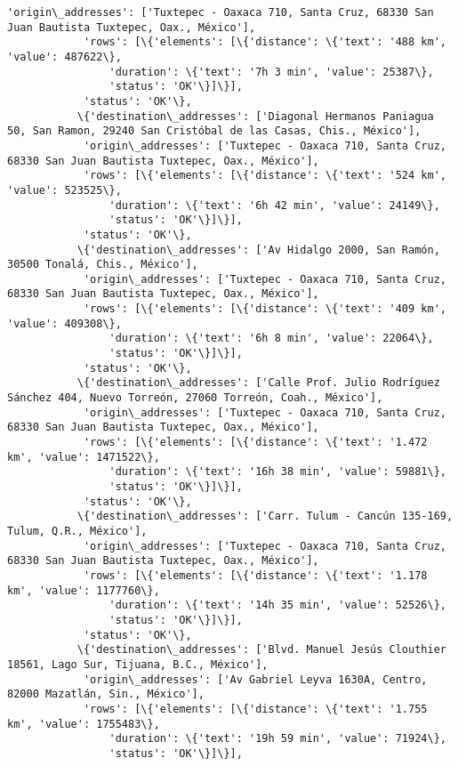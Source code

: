 \documentclass[11pt]{article}
\begin{document}
\begin{Verbatim}[commandchars=\\\{\}]
            'origin\_addresses': ['Tuxtepec - Oaxaca 710, Santa Cruz, 68330 San Juan Bautista Tuxtepec, Oax., México'],
            'rows': [\{'elements': [\{'distance': \{'text': '488 km', 'value': 487622\},
                'duration': \{'text': '7h 3 min', 'value': 25387\},
                'status': 'OK'\}]\}],
            'status': 'OK'\},
           \{'destination\_addresses': ['Diagonal Hermanos Paniagua 50, San Ramon, 29240 San Cristóbal de las Casas, Chis., México'],
            'origin\_addresses': ['Tuxtepec - Oaxaca 710, Santa Cruz, 68330 San Juan Bautista Tuxtepec, Oax., México'],
            'rows': [\{'elements': [\{'distance': \{'text': '524 km', 'value': 523525\},
                'duration': \{'text': '6h 42 min', 'value': 24149\},
                'status': 'OK'\}]\}],
            'status': 'OK'\},
           \{'destination\_addresses': ['Av Hidalgo 2000, San Ramón, 30500 Tonalá, Chis., México'],
            'origin\_addresses': ['Tuxtepec - Oaxaca 710, Santa Cruz, 68330 San Juan Bautista Tuxtepec, Oax., México'],
            'rows': [\{'elements': [\{'distance': \{'text': '409 km', 'value': 409308\},
                'duration': \{'text': '6h 8 min', 'value': 22064\},
                'status': 'OK'\}]\}],
            'status': 'OK'\},
           \{'destination\_addresses': ['Calle Prof. Julio Rodríguez Sánchez 404, Nuevo Torreón, 27060 Torreón, Coah., México'],
            'origin\_addresses': ['Tuxtepec - Oaxaca 710, Santa Cruz, 68330 San Juan Bautista Tuxtepec, Oax., México'],
            'rows': [\{'elements': [\{'distance': \{'text': '1.472 km', 'value': 1471522\},
                'duration': \{'text': '16h 38 min', 'value': 59881\},
                'status': 'OK'\}]\}],
            'status': 'OK'\},
           \{'destination\_addresses': ['Carr. Tulum - Cancún 135-169, Tulum, Q.R., México'],
            'origin\_addresses': ['Tuxtepec - Oaxaca 710, Santa Cruz, 68330 San Juan Bautista Tuxtepec, Oax., México'],
            'rows': [\{'elements': [\{'distance': \{'text': '1.178 km', 'value': 1177760\},
                'duration': \{'text': '14h 35 min', 'value': 52526\},
                'status': 'OK'\}]\}],
            'status': 'OK'\},
           \{'destination\_addresses': ['Blvd. Manuel Jesús Clouthier 18561, Lago Sur, Tijuana, B.C., México'],
            'origin\_addresses': ['Av Gabriel Leyva 1630A, Centro, 82000 Mazatlán, Sin., México'],
            'rows': [\{'elements': [\{'distance': \{'text': '1.755 km', 'value': 1755483\},
                'duration': \{'text': '19h 59 min', 'value': 71924\},
                'status': 'OK'\}]\}],

\end{Verbatim}
\end{document}
